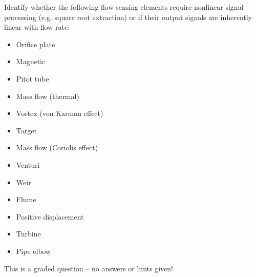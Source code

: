 

Identify whether the following flow sensing elements require nonlinear signal processing (e.g. square root extraction) or if their output signals are inherently linear with flow rate:

\begin{itemize}
\item{} Orifice plate
\vskip 5pt
\item{} Magnetic
\vskip 5pt
\item{} Pitot tube
\vskip 5pt
\item{} Mass flow (thermal)
\vskip 5pt
\item{} Vortex (von Karman effect)
\vskip 5pt
\item{} Target
\vskip 5pt
\item{} Mass flow (Coriolis effect)
\vskip 5pt
\item{} Venturi
\vskip 5pt
\item{} Weir
\vskip 5pt
\item{} Flume
\vskip 5pt
\item{} Positive displacement
\vskip 5pt
\item{} Turbine
\vskip 5pt
\item{} Pipe elbow
\end{itemize}

\vfil

\eject






This is a graded question -- no answers or hints given!







